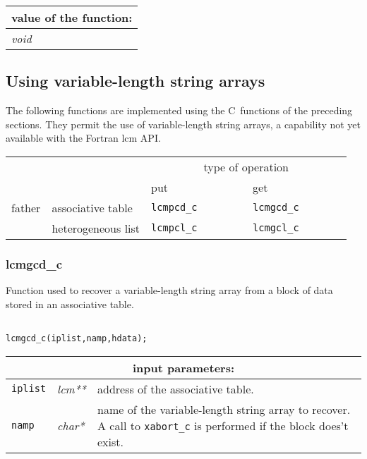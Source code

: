 \noindent
\begin{tabular}{|p{4.0cm}|p{11cm}|}
\hline
\multicolumn{2}{|c|}{\bf value of the function:} \\
\hline
{\it void} &  \\
\hline
\end{tabular}

\subsection{Using variable-length string arrays}

The following functions are implemented using the C~functions of the preceding sections. They
permit the use of variable-length string arrays, a capability not yet available with the Fortran
{\sc lcm} API.

\vskip 0.4cm

\begin{center}
\begin{tabular}{|c|l|l|l|}
\cline{3-4}
\multicolumn{2}{c|}{} & \multicolumn{2}{c|}{type of operation} \\
\cline{3-4}
\multicolumn{2}{c|}{} & put~~~~~~~~~~~~~ & get~~~~~~~~~~~~~ \\
\hline
father & associative table & {\tt lcmpcd\_c} & {\tt lcmgcd\_c} \\
\cline{2-4}
       & heterogeneous list & {\tt lcmpcl\_c} & {\tt lcmgcl\_c} \\
\hline
\end{tabular}
\end{center}

\subsubsection{lcmgcd\_c}\label{sect:lcmgcdc}

Function used to recover a variable-length string array from a block of data stored in an associative table.

\begin{verbatim}

lcmgcd_c(iplist,namp,hdata);
\end{verbatim}

\noindent
\begin{tabular}{|p{1.5cm}|p{2cm}|p{11cm}|}
\hline
\multicolumn{3}{|c|}{\bf input parameters:} \\
\hline
{\tt iplist} & {\it lcm**} & address of the associative table. \\
\hline
{\tt namp} & {\it char*} &  name of the variable-length string array
to recover. A call to {\tt xabort\_c} is performed if the block does't exist. \\
\hline
\end{tabular}

